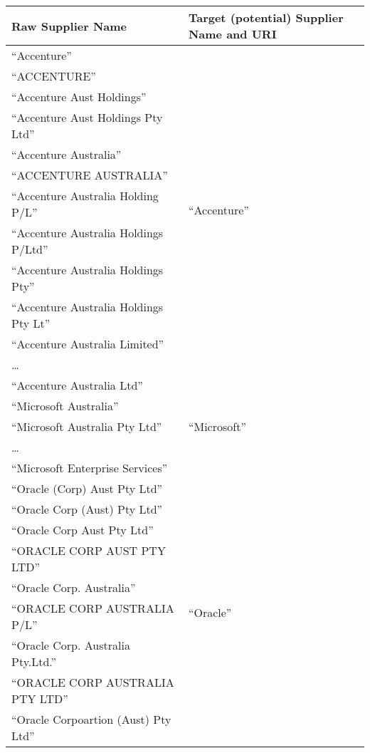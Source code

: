 \documentclass{llncs}
\begin{document}
\begin{table}[!htb]
\renewcommand{\arraystretch}{1.3}
\begin{center}
\begin{tabular}{|p{7cm}|p{7cm}|}
\hline
  \textbf{Raw Supplier Name} & \textbf{Target (potential) Supplier Name and URI}  \\  \hline
  ``Accenture'' & \multirow{12}{*}{``Accenture''} \\
  ``ACCENTURE'' & \multirow{12}{*}{\url{http://live.dbpedia.org/resource/Accenture}} \\ 
  ``Accenture Aust Holdings'' & \\  
  ``Accenture Aust Holdings Pty Ltd'' & \\
  ``Accenture Australia'' & \\
  ``ACCENTURE AUSTRALIA'' & \\
  ``Accenture  Australia Holding P/L'' & \\
  ``Accenture Australia Holdings P/Ltd'' & \\
  ``Accenture Australia Holdings Pty'' & \\
  ``Accenture Australia Holdings Pty Lt''  & \\  
  ``Accenture Australia Limited'' & \\
  \ldots  & \\
  ``Accenture Australia Ltd'' & \\ \hline
  ``Microsoft Australia'' & \multirow{3}{*}{``Microsoft''} \\
  ``Microsoft Australia Pty Ltd'' & \multirow{3}{*}{\url{http://live.dbpedia.org/resource/Microsoft}} \\
  \ldots  & \\
  ``Microsoft Enterprise Services'' & \\ \hline
  ``Oracle (Corp) Aust Pty Ltd''  & \multirow{14}{*}{``Oracle''} \\
  ``Oracle Corp (Aust) Pty Ltd''  & \multirow{14}{*}{\url{http://live.dbpedia.org/resource/Oracle_Corporation}} \\
  ``Oracle Corp Aust Pty Ltd'' & \\
  ``ORACLE CORP AUST PTY LTD'' & \\
  ``Oracle Corp. Australia'' & \\
  ``ORACLE CORP AUSTRALIA P/L'' & \\
  ``Oracle Corp. Australia Pty.Ltd.'' & \\
  ``ORACLE CORP AUSTRALIA PTY LTD'' & \\
  ``Oracle Corpoartion (Aust) Pty Ltd'' & \\

\end{tabular}
\end{center}
\end{table}
\end{document}
